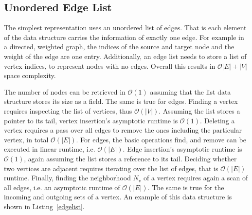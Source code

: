         \subsection{Unordered Edge List}
            The simplest representation uses an unordered list of edges. 
            That is each element of the data structure carries the information of exactly one edge. 
            For example in a directed, weighted graph, the indices of the source and target node and the weight of the edge are one entry. 
            Additionally, an edge list needs to store a list of vertex indices, to represent nodes with no edges.
            Overall this results in $\mathcal{O}|E| + |V|$ space complexity.
            
            The number of nodes can be retrieved in $\mathcal{O}(1)$ assuming that the list data structure stores its size as a field. 
            The same is true for edges.
            Finding a vertex requires inspecting the list of vertices, thus $\mathcal{O}(|V|)$. 
            Assuming the list stores a pointer to its tail, vertex insertion's asymptotic runtime is $\mathcal{O}(1)$. 
            Deleting a vertex requires a pass over all edges to remove the ones including the particular vertex, in total $\mathcal{O}(|E|)$.
            For edges, the basic operations find, and remove can be executed in linear runtime, i.e. $\mathcal{O}(|E|)$.
            Edge insertion's asymptotic runtime is $\mathcal{O}(1)$, again assuming the list stores a reference to its tail. 
            Deciding whether two vertices are adjacent requires iterating over the list of edges, that is 
            $\mathcal{O}(|E|)$ runtime.
            Finally, finding the neighborhood $N_v$ of a vertex requires again a scan of all edges, i.e. an asymptotic runtime of $\mathcal{O}(|E|)$. 
            The same is true for the incoming and outgoing sets of a vertex.
            An example of this data structure is shown in Listing~\ref{edgelist}.
            
